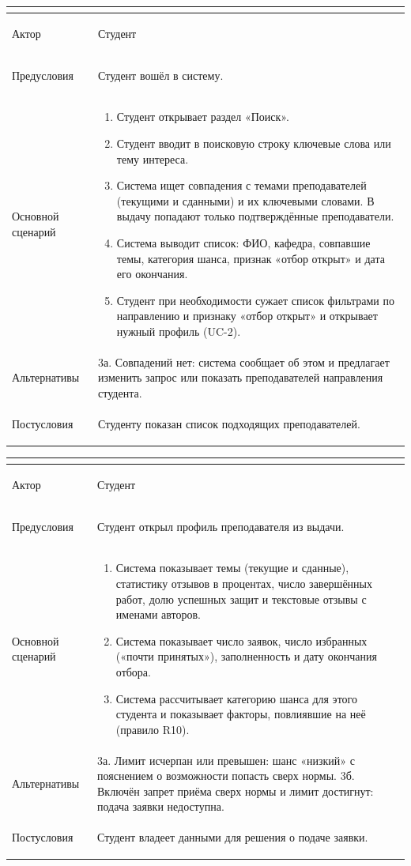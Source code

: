\documentclass[a4paper,12pt]{article}
\newenvironment{ucd}[3]{%
  \needspace{10\baselineskip}
  \begin{longtable}{|>{\bfseries\raggedright\arraybackslash}p{3.0cm}|p{11.8cm}|}
  \hline
  \multicolumn{2}{|l|}{\textbf{#1.\ #2}}\\ \hline
  Актор & #3\\ \hline
}{\end{longtable}}
\newcommand{\steps}[1]{\begin{enumerate}[nosep,leftmargin=*]#1\end{enumerate}}
\begin{document}
\begin{ucd}{UC-1}{Найти преподавателя через поисковую строку}{Студент}
Предусловия & Студент вошёл в систему.\\ \hline
Основной сценарий & \steps{
 \item Студент открывает раздел «Поиск».
 \item Студент вводит в поисковую строку ключевые слова или тему интереса.
 \item Система ищет совпадения с темами преподавателей (текущими и сданными) и их ключевыми словами. В выдачу попадают только подтверждённые преподаватели.
 \item Система выводит список: ФИО, кафедра, совпавшие темы, категория шанса, признак «отбор открыт» и дата его окончания.
 \item Студент при необходимости сужает список фильтрами по направлению и признаку «отбор открыт» и открывает нужный профиль (UC-2).}\\ \hline
Альтернативы & 3а. Совпадений нет: система сообщает об этом и предлагает изменить запрос или показать преподавателей направления студента.\\ \hline
Постусловия & Студенту показан список подходящих преподавателей.\\ \hline
\end{ucd}

\begin{ucd}{UC-2}{Просмотреть профиль преподавателя и оценку своих шансов}{Студент}
Предусловия & Студент открыл профиль преподавателя из выдачи.\\ \hline
Основной сценарий & \steps{
 \item Система показывает темы (текущие и сданные), статистику отзывов в процентах, число завершённых работ, долю успешных защит и текстовые отзывы с именами авторов.
 \item Система показывает число заявок, число избранных («почти принятых»), заполненность и дату окончания отбора.
 \item Система рассчитывает категорию шанса для этого студента и показывает факторы, повлиявшие на неё (правило R10).}\\ \hline
Альтернативы & 3а. Лимит исчерпан или превышен: шанс «низкий» с пояснением о возможности попасть сверх нормы.\newline
3б. Включён запрет приёма сверх нормы и лимит достигнут: подача заявки недоступна.\\ \hline
Постусловия & Студент владеет данными для решения о подаче заявки.\\ \hline
\end{ucd}
\end{document}
